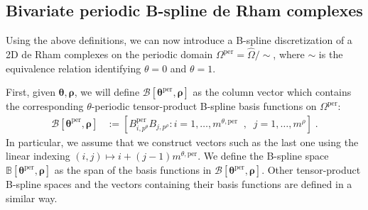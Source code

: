 \documentclass[10pt]{article}
\newcommand{\mbf}[1]{{\boldsymbol{#1}}}
\newcommand{\basis}[1]{\mathcal{#1}}
\newcommand{\vSpace}[1]{\mathbb{#1}}
\newcommand{\tpDomain}{\widehat{\Omega}}
\newcommand{\cU}{\theta}
\newcommand{\cV}{\rho}
\newcommand{\degU}{p^\cU}
\newcommand{\degV}{p^\cV}
\newcommand{\kntU}{\cU}
\newcommand{\kntV}{\cV}
\newcommand{\kntsU}{\mbf{\kntU}}
\newcommand{\kntsV}{\mbf{\kntV}}
\newcommand{\pkntsU}{\kntsU^\per}
\newcommand{\ndofV}{m^\cV}
\newcommand{\bsp}{B}
\newcommand{\bspB}{\basis{\bsp}}
\newcommand{\bspS}{\vSpace{\bsp}}
\newcommand{\per}{\mathrm{per}}
\newcommand{\pndofU}{m^{\cU,\per}}
\newcommand{\qDomain}{\Omega^{\per}}
\theoremstyle{plain}
\theoremstyle{definition}
\theoremstyle{remark}
\begin{document}
\subsection{Bivariate periodic B-spline de Rham complexes}
\label{sec:preliminaries-bivariate-bsplines}
Using the above definitions, we can now introduce a B-spline discretization of a 2D de Rham complexes on the periodic domain $\qDomain = \tpDomain / \sim$, where $\sim$ is the equivalence relation identifying $\cU = 0$ and $\cU = 1$.

First, given $\kntsU, \kntsV$, we will define $\bspB[\pkntsU,\kntsV]$ as the column vector which contains the corresponding $\cU$-periodic tensor-product B-spline basis functions on $\qDomain$:
\begin{equation}
  \begin{split}
    \bspB[\pkntsU,\kntsV] &:= [\bsp^\per_{i,\degU}\bsp_{j,\degV} : i = 1, \dots, \pndofU\;\;,\;\;j = 1, \dots, \ndofV]\;.
  \end{split}
\end{equation}
In particular, we assume that we construct vectors such as the last one using the linear indexing $(i,j) \mapsto i + (j-1)\pndofU$.
We define the B-spline space $\bspS[\pkntsU,\kntsV]$ as the span of the basis functions in $\bspB[\pkntsU,\kntsV]$.
Other tensor-product B-spline spaces and the vectors containing their basis functions are defined in a similar way.
\end{document}

